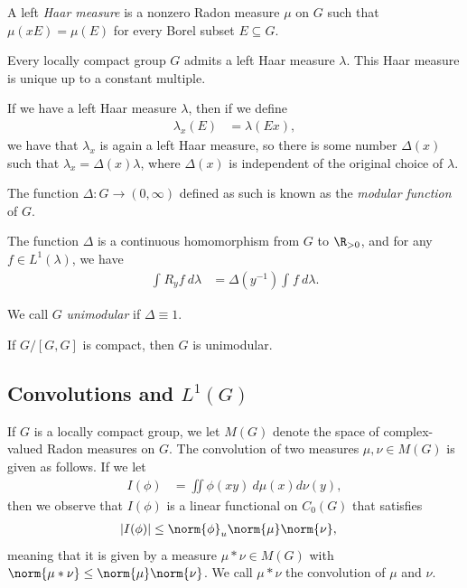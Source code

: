 \documentclass[12pt]{mypackage}
\begin{document}
A left \textit{Haar measure} is a nonzero Radon measure $\mu$ on $G$ such that $\mu\left( xE \right)=\mu(E)$ for every Borel subset $E\subseteq G$.
\begin{proposition}
  Every locally compact group $G$ admits a left Haar measure $\lambda$. This Haar measure is unique up to a constant multiple.
\end{proposition}
If we have a left Haar measure $\lambda$, then if we define
\begin{align*}
  \lambda_x(E) &= \lambda\left( Ex \right),
\end{align*}
we have that $\lambda_x$ is again a left Haar measure, so there is some number $\Delta(x)$ such that $\lambda_x = \Delta(x)\lambda$, where $\Delta(x)$ is independent of the original choice of $\lambda$.

The function $\Delta\colon G\rightarrow \left( 0,\infty \right)$ defined as such is known as the \textit{modular function} of $G$.
\begin{proposition}
  The function $\Delta$ is a continuous homomorphism from $G$ to $\R_{> 0}$, and for any $f\in L^1\left( \lambda \right)$, we have
  \begin{align*}
    \int_{}^{} R_yf\:d\lambda &= \Delta\left( y^{-1} \right) \int_{}^{} f\:d\lambda.
  \end{align*}
\end{proposition}
We call $G$ \textit{unimodular} if $\Delta\equiv 1$.
\begin{proposition}
  If $G/\left[ G,G \right]$ is compact, then $G$ is unimodular.
\end{proposition}
\subsection{Convolutions and $L^1(G)$}%
If $G$ is a locally compact group, we let $M(G)$ denote the space of complex-valued Radon measures on $G$. The convolution of two measures $\mu,\nu\in M(G)$ is given as follows. If we let
\begin{align*}
  I(\phi) &= \iint \phi(xy)\:d\mu(x)d\nu(y),
\end{align*}
then we observe that $I(\phi)$ is a linear functional on $C_0(G)$ that satisfies
\begin{align*}
  \left\vert I(\phi) \right\vert &\leq \norm{\phi}_{u}\norm{\mu}\norm{\nu},
\end{align*}
meaning that it is given by a measure $\mu\ast\nu\in M(G)$ with $\norm{\mu\ast\nu}\leq \norm{\mu}\norm{\nu}$. We call $\mu\ast\nu$ the convolution of $\mu$ and $\nu$.
\end{document}
